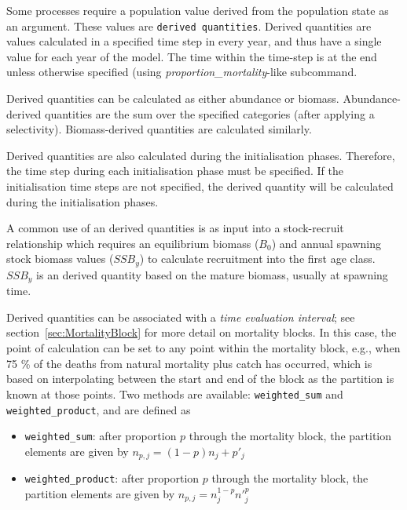 Some processes require a population value derived from the population state as an argument. These values are \texttt{derived quantities}. Derived quantities are values calculated in a specified time step in every year, and thus have a single value for each year of the model. The time within the time-step is at the end unless otherwise specified (using \textit{proportion\_mortality}-like subcommand.

Derived quantities can be calculated as either abundance or biomass. Abundance-derived quantities are the sum over the specified categories (after applying a selectivity)\label{sec:DerivedQuantity-Abundance}. Biomass-derived quantities are calculated similarly\label{sec:DerivedQuantity-Biomass}.

Derived quantities are also calculated during the initialisation phases. Therefore, the time step during each initialisation phase must be specified. If the initialisation time steps are not specified, the derived quantity will be calculated during the initialisation phases. 

A common use of an derived quantities is as input into a stock-recruit relationship  which requires an equilibrium biomass ($B_0$) and annual spawning stock biomass values ($SSB_y$) to calculate recruitment into the first age class. $SSB_y$ is an derived quantity based on the mature biomass, usually at spawning time.

Derived quantities can be associated with a \textit{time evaluation interval}; see section~\ref{sec:MortalityBlock} for more detail on mortality blocks. In this case, the point of calculation can be set to any point within the mortality block, e.g., when 75 \% of the deaths from natural mortality plus catch has occurred, which is based on interpolating between the start and end of the block as the partition is known at those points.  Two  methods are available: \texttt{weighted\_sum} and \texttt{weighted\_product}, and are defined as

\begin{itemize}
	\item \texttt{weighted\_sum}: after proportion $p$ through the mortality block, the partition elements are given by $n_{p,j} = (1 - p)n_j + p'_j$

	\item \texttt{weighted\_product}: after proportion $p$ through the mortality block, the partition elements are given by $n_{p,j} = n_j^{1-p} n'^p_j$
\end{itemize}

